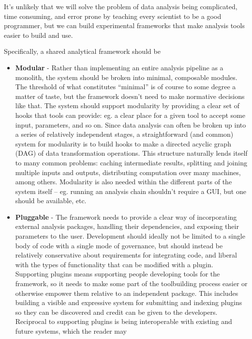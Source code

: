 It's unlikely that we will solve the problem of data analysis being
complicated, time consuming, and error prone by teaching every scientist
to be a good programmer, but we can build experimental frameworks that
make analysis tools easier to build and use.

Specifically, a shared analytical framework should be

\begin{itemize}
\tightlist
\item
  \textbf{Modular} - Rather than implementing an entire analysis
  pipeline as a monolith, the system should be broken into minimal,
  composable modules. The threshold of what constitutes ``minimal'' is
  of course to some degree a matter of taste, but the framework doesn't
  need to make normative decisions like that. The system should support
  modularity by providing a clear set of hooks that tools can provide:
  eg. a clear place for a given tool to accept some input, parameters,
  and so on. Since data analysis can often be broken up into a series of
  relatively independent stages, a straightforward (and common) system
  for modularity is to build hooks to make a directed acyclic graph
  (DAG) of data transformation operations. This structure naturally
  lends itself to many common problems: caching intermediate results,
  splitting and joining multiple inputs and outputs, distributing
  computation over many machines, among others. Modularity is also
  needed within the different parts of the system itself -- eg. running
  an analysis chain shouldn't require a GUI, but one should be
  available, etc.
\item
  \textbf{Pluggable} - The framework needs to provide a clear way of
  incorporating external analysis packages, handling their dependencies,
  and exposing their parameters to the user. Development should ideally
  not be limited to a single body of code with a single mode of
  governance, but should instead be relatively conservative about
  requirements for integrating code, and liberal with the types of
  functionality that can be modified with a plugin. Supporting plugins
  means supporting people developing tools for the framework, so it
  needs to make some part of the toolbuilding process easier or
  otherwise empower them relative to an independent package. This
  includes building a visible and expressive system for submitting and
  indexing plugins so they can be discovered and credit can be given to
  the developers. Reciprocal to supporting plugins is being
  interoperable with existing and future systems, which the reader may

\end{itemize}
